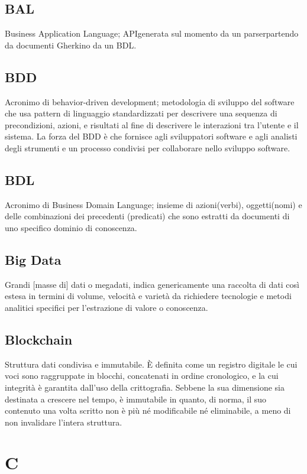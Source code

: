 \subsection*{BAL}
Business Application Language; API\glosp generata sul momento da un parser\glosp partendo da documenti Gherkin\glosp o da un BDL\glo.

\subsection*{BDD}
Acronimo di behavior-driven development; metodologia di sviluppo del software che usa pattern di linguaggio standardizzati per descrivere una sequenza di precondizioni, azioni, e risultati al fine di descrivere le interazioni tra l'utente  e il sistema. La forza del BDD è che fornisce agli sviluppatori software e agli analisti degli strumenti e un processo condivisi per collaborare nello sviluppo software.


\subsection*{BDL}
Acronimo di Business Domain Language; insieme di azioni(verbi), oggetti(nomi) e delle combinazioni dei precedenti (predicati) che sono estratti da documenti di uno specifico dominio di conoscenza.

\subsection*{Big Data}
Grandi [masse di] dati o megadati, indica genericamente una raccolta di dati così estesa in termini di volume, velocità e varietà da richiedere tecnologie e metodi analitici specifici per l'estrazione di valore o conoscenza. 

\subsection*{Blockchain}
Struttura dati condivisa e immutabile. È definita come un registro digitale le cui voci sono raggruppate in blocchi, concatenati in ordine cronologico, e la cui integrità è garantita dall'uso della crittografia. Sebbene la sua dimensione sia destinata a crescere nel tempo, è immutabile in quanto, di norma, il suo contenuto una volta scritto non è più né modificabile né eliminabile, a meno di non invalidare l'intera struttura. 

\section*{C}

